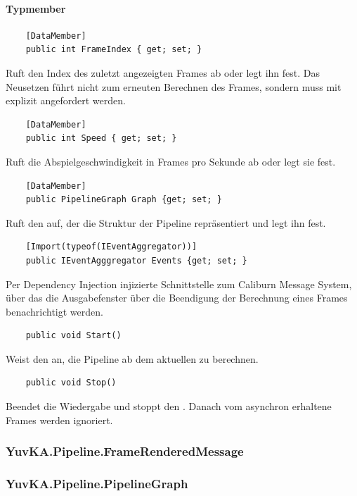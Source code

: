 \paragraph{Typmember}
\begin{itemize}

	\begin{verbatim}
	[DataMember]
	public int FrameIndex { get; set; }
	\end{verbatim}
	Ruft den Index des zuletzt angezeigten Frames ab oder legt ihn fest. Das Neusetzen führt nicht zum erneuten Berechnen des Frames, sondern muss mit  explizit angefordert werden.

	\begin{verbatim}
	[DataMember]
	public int Speed { get; set; }
	\end{verbatim}
	Ruft die Abspielgeschwindigkeit in Frames pro Sekunde ab oder legt sie fest.

	\begin{verbatim}
	[DataMember]
	public PipelineGraph Graph {get; set; }
	\end{verbatim}
	Ruft den  auf, der die Struktur der Pipeline repräsentiert und legt ihn fest.
	\begin{verbatim}
	[Import(typeof(IEventAggregator))]
	public IEventAgggregator Events {get; set; }
	\end{verbatim}
	Per Dependency Injection injizierte Schnittstelle zum Caliburn Message System, über das die Ausgabefenster über die Beendigung der Berechnung eines Frames benachrichtigt werden.

	\begin{verbatim}
	public void Start()
	\end{verbatim}
	Weist den  an, die Pipeline ab dem aktuellen  zu berechnen.

	\begin{verbatim}
	public void Stop()
	\end{verbatim}
	Beendet die Wiedergabe und stoppt den . Danach vom  asynchron erhaltene Frames werden ignoriert.
\end{itemize}

\subsubsection{YuvKA.Pipeline.FrameRenderedMessage}

\subsubsection{YuvKA.Pipeline.PipelineGraph}
